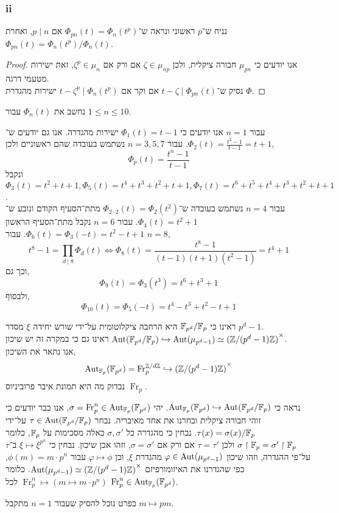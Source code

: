 \subsubsection{ii}
נניח ש־$p$ ראשוני ונראה ש־$\Phi_{pn}(t) = \Phi_n(t^p)$ אם $p \mid n$, ואחרת $\Phi_{pn}(t) = \Phi_n(t^p) / \Phi_n(t)$.
\begin{proof}
	אנו יודעים כי $\mu_{pn}$ חבורה ציקלית, ולכן $\zeta \in \mu_{np}$ אם ורק אם $\zeta^p \in \mu_n$, זאת ישירות מטעמי דרגה. \\
	נסיק ש־$t - \zeta \mid \Phi_{pn}(t)$ אם וקר אם $t - \zeta^p \mid \Phi_{n}(t^p)$ ישירות מהגדרת $\Phi$.
\end{proof}

\subquestion{}
נחשב את $\Phi_n(t)$ עבור $1 \le n \le 10$.
\begin{solution}
	עבור $n = 1$ אנו יודעים כי $\Phi_1(t) = t - 1$ ישירות מהגדרה.
	אנו גם יודעים ש־$\Phi_2(t) = \frac{t^2 - 1}{t - 1} = t + 1$.
	עבור $n = 3, 5, 7$ נשתמש בעובדה שהם ראשוניים ולכן,
	\[
		\Phi_p(t) = \frac{t^n - 1}{t - 1}
	\]
	ונקבל $\Phi_3(t) = t^2 + t + 1, \Phi_5(t) = t^4 + t^3 + t^2 + t + 1, \Phi_7(t) = t^6 + t^5 + t^4 + t^3 + t^2 + t + 1$. \\
	עבור $n = 4$ נשתמש בעובדה ש־$\Phi_{2 \cdot 2}(t) = \Phi_2(t^2)$ מתת־הסעיף הקודם ונובע ש־$\Phi_4(t) = t^2 + 1$.
	עבור $n = 6$ נקבל מתת־הסעיף הראשון $\Phi_6(t) = \Phi_3(-t) = t^2 - t + 1$.
	עבור $n = 8$,
	\[
		t^8 - 1
		= \prod_{d \mid 8} \Phi_d(t)
		\iff
		\Phi_8(t)
		= \frac{t^8 - 1}{(t - 1)(t + 1)(t^2 - 1)}
		= t^4 + 1
	\]
	וכך גם,
	\[
		\Phi_9(t)
		= \Phi_3(t^3)
		= t^6 + t^3 + 1
	\]
	ולבסוף,
	\[
		\Phi_{10}(t)
		= \Phi_5(-t)
		= t^4 - t^3 + t^2 - t + 1
	\]
\end{solution}

\question{}
ראינו כי $\mathbb{F}_{p^d} / \mathbb{F}_p$ היא הרחבה ציקלוטומית על־ידי שורש יחידה $\xi$ מסדר $p^d - 1$. \\
ראינו גם כי במקרה זה יש שיכון $\operatorname{Aut}(\mathbb{F}_{p^d} / \mathbb{F}_p) \hookrightarrow \operatorname{Aut}(\mu_{p^d - 1}) \simeq {(\mathbb{Z}/ (p^d - 1) \mathbb{Z})}^\times$. \\
אנו נתאר את השיכון,
\[
	\operatorname{Aut}_{\mathbb{F}_p}(\mathbb{F}_{p^d})
	= \operatorname{Fr}_p^{\mathbb{Z} / d \mathbb{Z}}
	\hookrightarrow {(\mathbb{Z}/ (p^d - 1) \mathbb{Z})}^\times
\]
נבדוק מה היא תמונת איבר פרוביניוס $\operatorname{Fr}_p$.
\begin{solution}
	נראה כי $\operatorname{Aut}_{\mathbb{F}_p}(\mathbb{F}_{p^d}) \hookrightarrow \operatorname{Aut}(\mathbb{F}_{p^d} / \mathbb{F}_p)$.
	יהי $\sigma = \operatorname{Fr}_p^n \in \operatorname{Aut}_{\mathbb{F}_p}(\mathbb{F}_{p^d})$,
	אנו כבר יודעים כי זוהי חבורה ציקלית ובחרנו את אחד מאיבריה.
	נבחר $\tau \in \operatorname{Aut}(\mathbb{F}_{p^d} / \mathbb{F}_p)$ על־ידי $\tau(x) = \sigma(x) / \mathbb{F}_p$.
	נבחין כי מהגדרה כל $\sigma, \sigma'$ כאלה מסכימות על $\mathbb{F}_p$, כלומר $\sigma \restriction \mathbb{F}_p = \sigma' \restriction \mathbb{F}_p$ ולכן $\tau = \tau'$ אם ורק אם $\sigma = \sigma'$, וזהו אכן שיכון.
	נבחין כי $\xi \mapsto \xi^{p^n}$ ב־$\tau$ על־פי ההגדרה, וזהו שיכון $\varphi \in \operatorname{Aut}(\mu_{p^d - 1})$ מהגדרת $\xi$, וכן $\varphi \mapsto \phi$ עבור $\phi(m) = m \cdot p^n$,
	כפי שהגדרנו את האיזומורפיזם $\operatorname{Aut}(\mu_{p^d - 1}) \simeq {(\mathbb{Z}/ (p^d - 1) \mathbb{Z})}^\times$.
	כלומר $\operatorname{Fr}_p^n \mapsto (m \mapsto m \cdot p^n)$ לכל $\operatorname{Fr}_p^n \in \operatorname{Aut}_{\mathbb{F}_p}(\mathbb{F}_{p^d})$.

	בפרט נוכל להסיק שעבור $n = 1$ מתקבל $m \mapsto p m$.
\end{solution}

